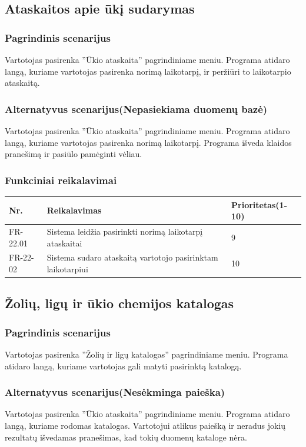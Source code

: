 \documentclass[oneside]{VUMIFPSkursinis}
\begin{document}
\subsection{Ataskaitos apie ūkį sudarymas}
	\subsubsection{Pagrindinis scenarijus}
	Vartotojas pasirenka ''Ūkio ataskaita'' pagrindiniame meniu. Programa atidaro langą, kuriame vartotojas pasirenka norimą laikotarpį, ir peržiūri to laikotarpio ataskaitą.
	\subsubsection{Alternatyvus scenarijus(Nepasiekiama duomenų bazė)}
	Vartotojas pasirenka ''Ūkio ataskaita'' pagrindiniame meniu. Programa atidaro langą, kuriame vartotojas pasirenka norimą laikotarpį. Programa išveda klaidos pranešimą ir pasiūlo pamėginti vėliau.
	\subsubsection{Funkciniai reikalavimai}
	\begin{table}[htbp]
		\begin{tabularx}{1\textwidth}{ |P{2.5cm}|X|P{3cm }| }  \hline
			Nr. & Reikalavimas & Prioritetas(1-10) \\ \hline
			FR-22.01 & Sistema leidžia pasirinkti norimą laikotarpį ataskaitai & 9 \\ \hline
			FR-22-02 & Sistema sudaro ataskaitą vartotojo pasirinktam laikotarpiui & 10 \\ \hline	
		\end{tabularx}
	\end{table}
\subsection{Žolių, ligų ir ūkio chemijos katalogas}
	\subsubsection{Pagrindinis scenarijus}
	Vartotojas pasirenka ''Žolių ir ligų katalogas'' pagrindiniame meniu. Programa atidaro langą, kuriame vartotojas gali matyti pasirinktą katalogą.
	\subsubsection{Alternatyvus scenarijus(Nesėkminga paieška)}
	Vartotojas pasirenka ''Ūkio ataskaita'' pagrindiniame meniu. Programa atidaro langą, kuriame rodomas katalogas. Vartotojui atlikus paiešką ir neradus jokių rezultatų išvedamas pranešimas, kad tokių duomenų kataloge nėra.
\end{document}
